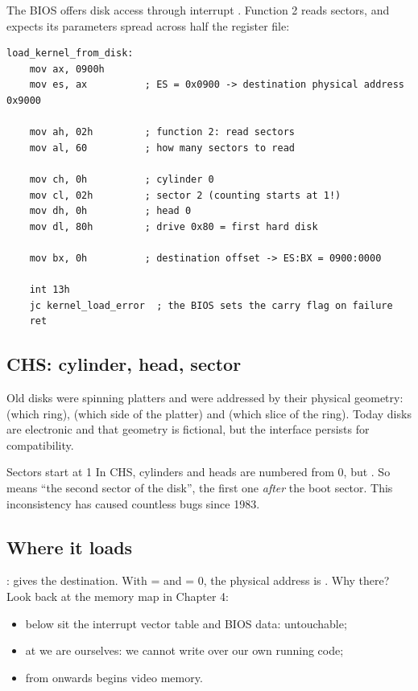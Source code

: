 The BIOS offers disk access through interrupt . Function 2 reads sectors, and expects its
parameters spread across half the register file:

\begin{lstlisting}[style=asm]
load_kernel_from_disk:
    mov ax, 0900h
    mov es, ax          ; ES = 0x0900 -> destination physical address 0x9000

    mov ah, 02h         ; function 2: read sectors
    mov al, 60          ; how many sectors to read

    mov ch, 0h          ; cylinder 0
    mov cl, 02h         ; sector 2 (counting starts at 1!)
    mov dh, 0h          ; head 0
    mov dl, 80h         ; drive 0x80 = first hard disk

    mov bx, 0h          ; destination offset -> ES:BX = 0900:0000

    int 13h
    jc kernel_load_error  ; the BIOS sets the carry flag on failure
    ret
\end{lstlisting}

\subsection{CHS: cylinder, head, sector}

Old disks were spinning platters and were addressed by their physical geometry: 
(which ring),  (which side of the platter) and  (which slice of the ring).
Today disks are electronic and that geometry is fictional, but the interface persists for
compatibility.

\begin{warn}{Sectors start at 1}
In CHS, cylinders and heads are numbered from 0, but . So
 means ``the second sector of the disk'', the first one \emph{after} the boot sector.
This inconsistency has caused countless bugs since 1983.
\end{warn}

\subsection{Where it loads}

: gives the destination. With  =  and  = 0, the physical
address is . Why there? Look back at the memory map in Chapter 4:

\begin{itemize}
  \item below  sit the interrupt vector table and BIOS data: untouchable;
  \item at  we are ourselves: we cannot write over our own running code;
  \item from  onwards begins video memory.
\end{itemize}

